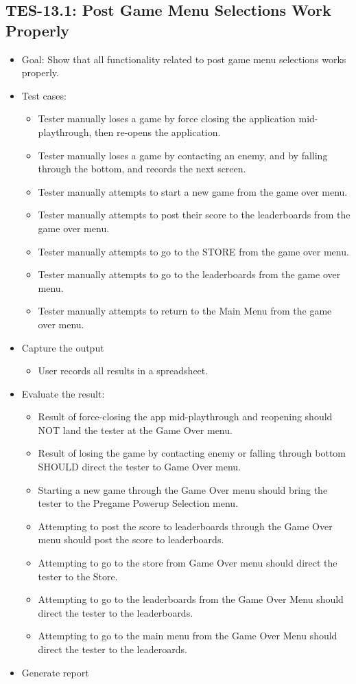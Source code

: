 \subsection{TES-13.1: Post Game Menu Selections Work Properly }
\begin{itemize}
\item Goal: Show that all functionality related to post game menu selections works properly. 
\item Test cases: 

\begin{itemize}
\item Tester manually loses a game by force closing the application mid-playthrough, then re-opens the application.
\item Tester manually loses a game by contacting an enemy, and by falling through the bottom, and records the next screen.
\item Tester manually attempts to start a new game from the game over menu.
\item Tester manually attempts to post their score to the leaderboards from the game over menu.
\item Tester manually attempts to go to the STORE from the game over menu.
\item Tester manually attempts to go to the leaderboards from the game over menu.
\item Tester manually attempts to return to the Main Menu from the game over menu.
\end{itemize}
\item Capture the output 
\begin{itemize}
\item User records all results in a spreadsheet.
\end{itemize}
\item Evaluate the result: 

\begin{itemize}
\item Result of force-closing the app mid-playthrough and reopening should NOT land the tester at the Game Over menu.
\item Result of losing the game by contacting enemy or falling through bottom SHOULD direct the tester to Game Over menu.
\item Starting a new game through the Game Over menu should bring the tester to the Pregame Powerup Selection menu.
\item Attempting to post the score to leaderboards through the Game Over menu should post the score to leaderboards.
\item Attempting to go to the store from Game Over menu should direct the tester to the Store.
\item Attempting to go to the leaderboards from the Game Over Menu should direct the tester to the leaderboards.
\item Attempting to go to the main menu from the Game Over Menu should direct the tester to the leaderoards.
\end{itemize}
\item Generate report 
\end{itemize}

